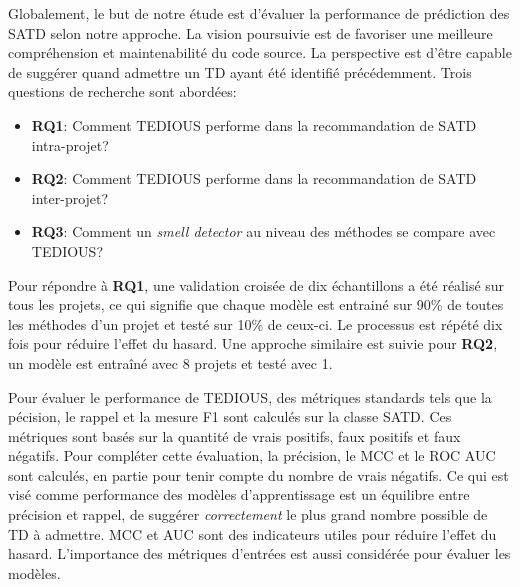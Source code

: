 Globalement, le but de notre \'{e}tude est d'\'{e}valuer la performance de pr\'{e}diction des \ac{SATD} selon notre approche. La vision poursuivie est de favoriser une meilleure compr\'{e}hension et maintenabilit\'{e} du code source. La perspective est d'\^{e}tre capable de sugg\'{e}rer quand admettre un \ac{TD} ayant \'{e}t\'{e} identifi\'{e} pr\'{e}c\'{e}demment. Trois questions de recherche sont abord\'{e}es: \par

\begin{itemize}
	\item \textbf{RQ1}: Comment \ac{TEDIOUS} performe dans la recommandation de \ac{SATD} intra-projet? 
	\item \textbf{RQ2}: Comment \ac{TEDIOUS} performe dans la recommandation de \ac{SATD} inter-projet?
	\item \textbf{RQ3}: Comment un \emph{smell detector} au niveau des m\'{e}thodes se compare avec \ac{TEDIOUS}?
\end{itemize}


Pour r\'{e}pondre \`{a} \textbf{RQ1}, une validation crois\'{e}e de dix \'{e}chantillons a \'{e}t\'{e} r\'{e}alis\'{e} sur tous les projets, ce qui signifie que chaque mod\`{e}le est entrain\'{e} sur 90\% de toutes les m\'{e}thodes d'un projet et test\'{e} sur 10\% de ceux-ci.  Le processus est r\'{e}p\'{e}t\'{e} dix fois pour r\'{e}duire l'effet du hasard. Une approche similaire est suivie pour \textbf{RQ2}, un mod\`{e}le est entra\^{i}n\'{e} avec 8 projets et test\'{e} avec 1. \par

Pour \'{e}valuer le performance de \ac{TEDIOUS}, des m\'{e}triques standards tels que la p\'{e}cision, le rappel et la mesure F1 sont calcul\'{e}s sur la classe \ac{SATD}. Ces m\'{e}triques sont bas\'{e}s sur la quantit\'{e} de vrais positifs, faux positifs et faux n\'{e}gatifs. Pour compl\'{e}ter cette \'{e}valuation, la pr\'{e}cision, le \ac{MCC} et le \ac{ROC} \ac{AUC} sont calcul\'{e}s, en partie pour tenir compte du nombre de vrais n\'{e}gatifs. Ce qui est vis\'{e} comme performance des mod\`{e}les d'apprentissage est un \'{e}quilibre entre pr\'{e}cision et rappel, de sugg\'{e}rer \emph{correctement} le plus grand nombre possible de \ac{TD} \`{a} admettre. \ac{MCC} et \ac{AUC} sont des indicateurs  utiles pour r\'{e}duire l'effet du hasard. L'importance des m\'{e}triques d'entr\'{e}es est aussi consid\'{e}r\'{e}e pour \'{e}valuer les mod\`{e}les. \par

